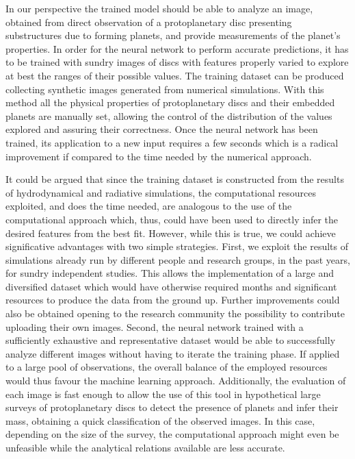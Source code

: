 \documentclass[a4paper,10pt]{report}
\begin{document}
In our perspective the trained model should be able to analyze an image, obtained from direct observation of a protoplanetary disc
presenting substructures due to forming planets, and provide measurements of the planet's properties.
In order for the neural network to perform accurate predictions, it has to be trained with sundry images of discs with
features properly varied to explore at best the ranges of their possible values. 
The training dataset can be produced collecting synthetic images generated from numerical simulations. With this method
all the physical properties of protoplanetary discs and their embedded planets are manually set, allowing the control of the 
distribution of the values explored and assuring their correctness.
Once the neural network has been trained, its application to a new input requires a few seconds which is a radical improvement
if compared to the time needed by the numerical approach.

It could be argued that since the training dataset is constructed from the results of hydrodynamical and radiative simulations,
the computational resources exploited, and does the time needed, are analogous to the use of the computational approach
which, thus, could have been used to
directly infer the desired features from the best fit. However, while this is true, we could achieve significative
advantages with two simple strategies.
First, we exploit the results of simulations already run by different people and research groups, in the past years,
for sundry independent studies. This allows the implementation of a large and diversified dataset which would have
otherwise required months and significant resources to produce the data from the ground up. Further improvements could also be obtained opening 
to the research community the possibility to contribute
uploading their own images.
Second, the neural network trained with a sufficiently exhaustive and representative dataset would be able to
successfully analyze different images without having to iterate the training phase. If applied to a large pool of observations,
the overall balance of the employed resources
would thus favour the machine learning approach. Additionally, the evaluation of each image is fast enough to allow 
the use of this tool in hypothetical large surveys of protoplanetary discs to detect the presence of planets
and infer their mass, obtaining a quick classification of the observed images. In this case, depending on the size of the survey,
the computational approach might even be unfeasible while the analytical relations available are less accurate.
\end{document}
